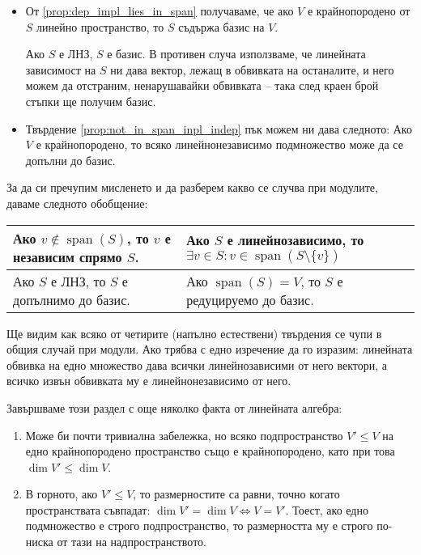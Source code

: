 \documentclass{article}
\newif\ifusemulticols
\theoremstyle{definition}
\theoremstyle{remark}
\theoremstyle{plain}
\theoremstyle{plain}
\newenvironment{mymulticols}
    { \ifusemulticols \begin{multicols}{2} \fi }
    { \ifusemulticols \end{multicols} \fi }
\DeclareMathOperator{\vecspan}{span}
\begin{document}
\begin{mymulticols}
\begin{itemize}
    \item От \ref{prop:dep_impl_lies_in_span} получаваме, че ако $V$ е крайнопородено от $S$
        линейно пространство, то $S$ съдържа базис на $V$.

        Ако $S$ е ЛНЗ, $S$ е базис. В противен случа използваме, че линейната зависимост на $S$ ни
        дава вектор, лежащ в обвивката на останалите, и него можем да отстраним, ненарушавайки
        обвивката -- така след краен брой стъпки ще получим базис.

    \item Твърдение \ref{prop:not_in_span_inpl_indep} пък можем ни дава следното: Ако $V$ е
        крайнопородено, то всяко линейнонезависимо подмножество може да се допълни до базис.
\end{itemize}

За да си пречупим мисленето и да разберем какво се случва при модулите, даваме следното обобщение:

\begin{table}[h]
    \begin{tabular}{L|L}
        Ако $v\not\in\vecspan(S)$, то $v$ е независим спрямо $S$. &
        Ако $S$ е линейнозависимо, то ${\exists v \in S}: {v \in \vecspan(S\setminus \{v\})}$ \\
        \hline
        Ако $S$ е ЛНЗ, то $S$ е допълнимо до базис. &
        Ако $\vecspan(S)=V$, то $S$ е редуцируемо до базис.
    \end{tabular}%
\end{table}

Ще видим как всяко от четирите (напълно естествени) твърдения се чупи в общия случай при модули.
Ако трябва с едно изречение да го изразим: линейната обвивка на едно множество дава всички
линейнозависими от него вектори, а всичко извън обвивката му е линейнонезависимо от него.

Завършваме този раздел с още няколко факта от линейната алгебра:
\begin{enumerate}
    \item Може би почти тривиална забележка, но всяко подпространство $V' \le V$ на едно
        крайнопородено пространство също е крайнопородено, като при това $\dim V' \le \dim V$.

    \item В горното, ако $V'\le V$, то размерностите са равни, точно когато пространствата съвпадат:
        $\dim V'=\dim V \Leftrightarrow V = V'$. Тоест, ако едно подмножество е строго подпространство,
        то размерността му е строго по-ниска от тази на надпространството.


\end{enumerate}
\end{mymulticols}
\end{document}
